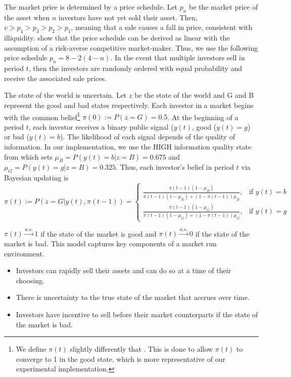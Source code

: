 \documentclass[11pt]{article}
\begin{document}
The market price is determined by a price schedule. Let $p_n$ be the market price of the asset when $n$ investors have not yet sold their asset. Then, $ v > p_4 > p_3 > p_2 > p_1$, meaning that a sale causes a fall in price, consistent with illiquidity. \cite{bernardo2004liquidity} show that the price schedule can be derived as linear with the assumption of a risk-averse competitive market-maker. Thus, we use the following price schedule $p_n = 8 - 2(4-n)$. In the event that multiple investors sell in period $t$, then the investors are randomly ordered with equal probability and receive the associated sale prices.

The state of the world is uncertain. Let $z$ be the state of the world and G and B represent the good and bad states respectively. Each investor in a market begins with the common belief\footnote{We define $\pi(t)$ slightly differently that \cite{magnani2020dynamic}. This is done to allow $\pi(t)$ to converge to 1 in the good state, which is more representative of our experimental implementation.}  $\pi(0) := P(z = G) = 0.5$. At the beginning of a period $t$, each investor receives a binary public signal ($y(t)$, good ($y(t) = g$) or bad ($y(t) = b$). The likelihood of each signal depends of the quality of information. In our implementation, we use the HIGH information quality state from \cite{magnani2020dynamic} which sets $\mu_B = P(y(t) = b | z = B) = 0.675$ and $\mu_G = P(y(t) = g | z = B) = 0.325$. Thus, each investor's belief in period $t$ via Bayesian updating is
\begin{equation}
    \pi(t) := P(z = G|y(t), \pi(t-1)) =
    \begin{cases}
        \frac{\pi(t-1)(1-\mu_B)}{\pi(t-1)(1-\mu_B) + (1-\pi(t-1))\mu_B}, & \text{if   } y(t) = b \\
        \frac{\pi(t-1)(1-\mu_G)}{\pi(t-1)(1-\mu_G) + (1-\pi(t-1))\mu_G}, & \text{if   } y(t) = g
    \end{cases}
    \label{eq:bayes}
\end{equation}

$\pi(t) \overset{a.s.}{\to} 1$ if the state of the market is good and $\pi(t) \overset{a.s.}{\to} 0 $ if the state of the market is bad.
This model captures key components of a market run environment.
\begin{itemize}
    \item Investors can rapidly sell their assets and can do so at a time of their choosing.
    \item There is uncertainty to the true state of the market that accrues over time.
    \item Investors have incentive to sell before their market counterparts if the state of the market is bad.
\end{itemize}
\end{document}
